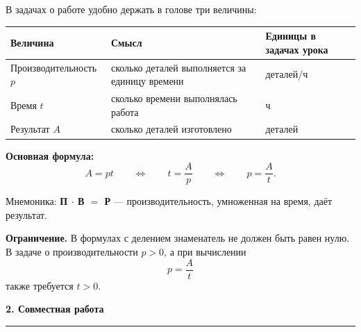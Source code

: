 \documentclass[a4paper,12pt]{article}
\newcommand{\lessonsection}[1]{%
  \vspace{0.35em}
  {\Large\bfseries\textcolor{darkaccent}{#1}}\par
  \vspace{0.2em}
  {\color{accent}\rule{\linewidth}{0.6pt}}\par
  \vspace{0.4em}
}
\newcommand{\keyidea}[1]{\textbf{\textcolor{darkaccent}{#1}}}
\begin{document}
В задачах о работе удобно держать в голове три величины:

\begin{center}
\begin{tabularx}{0.92\linewidth}{@{}lXl@{}}
\toprule
\textbf{Величина} & \textbf{Смысл} & \textbf{Единицы в задачах урока} \\
\midrule
Производительность $p$ &
сколько деталей выполняется за единицу времени &
деталей/ч \\
Время $t$ &
сколько времени выполнялась работа &
ч \\
Результат $A$ &
сколько деталей изготовлено &
деталей \\
\bottomrule
\end{tabularx}
\end{center}

\keyidea{Основная формула:}
\[
\boxed{A=pt}
\qquad\Longleftrightarrow\qquad
\boxed{t=\frac{A}{p}}
\qquad\Longleftrightarrow\qquad
\boxed{p=\frac{A}{t}}.
\]

Мнемоника: \textbf{П $\cdot$ В $=$ Р} ---
производительность, умноженная на время, даёт результат.

\begin{center}
\end{center}

\textbf{Ограничение.}
В формулах с делением знаменатель не должен быть равен нулю.
В задаче о производительности $p>0$, а при вычислении
\[
p=\frac{A}{t}
\]
также требуется $t>0$.

\lessonsection{2. Совместная работа}
\end{document}
